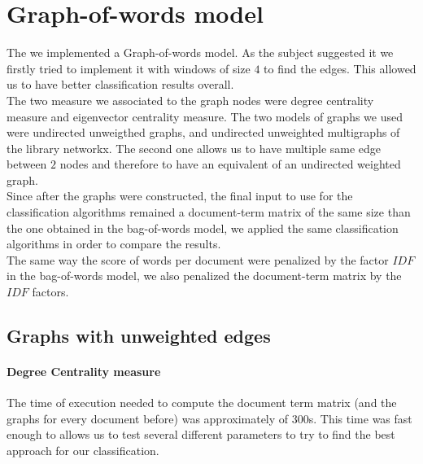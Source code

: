 \documentclass[11pt,a4paper]{article}
\begin{document}
\section{Graph-of-words model}
The we implemented a Graph-of-words model. As the subject suggested it we firstly tried to implement it with windows of size $4$ to find the edges. This allowed us to have better classification results overall. \\
The two measure we associated to the graph nodes were degree centrality measure and eigenvector centrality measure.
The two models of graphs we used were undirected unweigthed graphs, and undirected unweighted multigraphs of the library networkx. The second one allows us to have multiple same edge between $2$ nodes and therefore to have an equivalent of an undirected weighted graph.\\
Since after the graphs were constructed, the final input to use for the classification algorithms remained a document-term matrix of the same size than the one obtained in the bag-of-words model, we applied the same classification algorithms in order to compare the results.\\
The same way the score of words per document were penalized by the factor $IDF$ in the bag-of-words model, we also penalized the document-term matrix by the $IDF$ factors.
\subsection{Graphs with unweighted edges}
\paragraph{Degree Centrality measure \newline}
The time of execution needed to compute the document term matrix (and the graphs for every document before) was approximately of 300s. This time was fast enough to allows us to test several different parameters to try to find the best approach for our classification.
\end{document}
